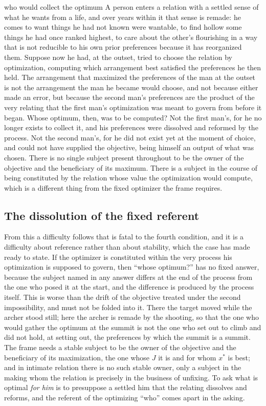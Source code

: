 \begin{casebox}{who would collect the optimum}
A person enters a relation with a settled sense of what he wants from a life, and over years within it that sense is remade: he comes to want things he had not known were wantable, to find hollow some things he had once ranked highest, to care about the other's flourishing in a way that is not reducible to his own prior preferences because it has reorganized them. Suppose now he had, at the outset, tried to choose the relation by optimization, computing which arrangement best satisfied the preferences he then held. The arrangement that maximized the preferences of the man at the outset is not the arrangement the man he became would choose, and not because either made an error, but because the second man's preferences are the product of the very relating that the first man's optimization was meant to govern from before it began. Whose optimum, then, was to be computed? Not the first man's, for he no longer exists to collect it, and his preferences were dissolved and reformed by the process. Not the second man's, for he did not exist yet at the moment of choice, and could not have supplied the objective, being himself an output of what was chosen. There is no single subject present throughout to be the owner of the objective and the beneficiary of its maximum. There is a subject in the course of being constituted by the relation whose value the optimization would compute, which is a different thing from the fixed optimizer the frame requires.
\end{casebox}

\subsection*{The dissolution of the fixed referent}

From this a difficulty follows that is fatal to the fourth condition, and it is a difficulty about reference rather than about stability, which the case has made ready to state. If the optimizer is constituted within the very process his optimization is supposed to govern, then ``whose optimum?'' has no fixed answer, because the subject named in any answer differs at the end of the process from the one who posed it at the start, and the difference is produced by the process itself. This is worse than the drift of the objective treated under the second impossibility, and must not be folded into it. There the target moved while the archer stood still; here the archer is remade by the shooting, so that the one who would gather the optimum at the summit is not the one who set out to climb and did not hold, at setting out, the preferences by which the summit is a summit. The frame needs a stable subject to be the owner of the objective and the beneficiary of its maximization, the one whose $J$ it is and for whom $x^{\ast}$ is best; and in intimate relation there is no such stable owner, only a subject in the making whom the relation is precisely in the business of unfixing. To ask what is optimal \emph{for him} is to presuppose a settled him that the relating dissolves and reforms, and the referent of the optimizing ``who'' comes apart in the asking.

